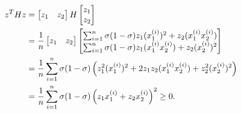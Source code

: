 \begin{answer}
$$
\begin{aligned}
z^T H z &=
\begin{bmatrix}
    z_1 & z_2 \\
\end{bmatrix}
H
\begin{bmatrix}
    z_1 \\
    z_2 \\
\end{bmatrix} \\
&= {1 \over n} 
\begin{bmatrix}
    z_1 & z_2 \\
\end{bmatrix}
\begin{bmatrix}
    \sum_{i=1}^n \sigma (1-\sigma) z_1 (x_1^{(i)})^2 + z_2 (x_1^{(i)}x_2^{(i)}) \\
    \sum_{i=1}^n \sigma (1-\sigma) z_1 (x_1^{(i)}x_2^{(i)}) + z_2 (x_2^{(i)})^2 \\
\end{bmatrix} \\
&= {1 \over n}
\sum_{i=1}^n \sigma (1-\sigma) \left( z_1^2 (x_1^{(i)})^2 + 2 z_1 z_2 (x_1^{(i)}x_2^{(i)}) + z_2^2 (x_2^{(i)})^2 \right) \\
&= {1 \over n} \sum_{i=1}^n \sigma (1-\sigma) \left( z_1 x_1^{(i)}+ z_2 x_2^{(i)} \right)^2 \geq 0.
\end{aligned}
$$
\end{answer}
